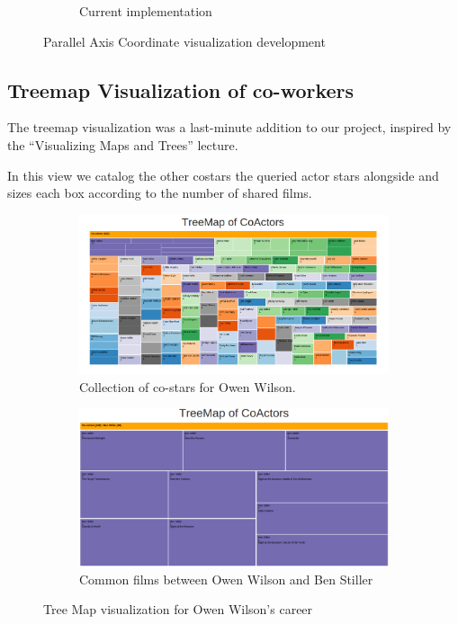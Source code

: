 \documentclass[12pt]{article}
\begin{document}
\begin{figure}[h!]
\begin{subfigure}[t]{.8\textwidth}
			  \caption{Current implementation}
			  \label{fig:sub2}
		\end{subfigure}%
		\caption{Parallel Axis Coordinate visualization development}
		\label{fig:parallelAxisCoordVis}
	\end{figure}


\newpage 

\subsection{Treemap Visualization of co-workers}

The treemap visualization was a last-minute addition to our project, inspired by the ``Visualizing Maps and Trees'' lecture.

In this view we catalog the other costars the queried actor stars alongside and sizes each box according to the number of shared films.
	\begin{figure}[h!]
		\centering
		\begin{subfigure}[t]{.5\textwidth}
		  \centering
		  \includegraphics[width=\linewidth]{images/treemapOwenWilson.png}
		  \caption{Collection of co-stars for Owen Wilson.}
		  \label{fig:treemapA}
		\end{subfigure}%
		\begin{subfigure}[t]{.8\textwidth}
		  \centering
		  \includegraphics[width=.7\linewidth]{images/treemapZoomWilson.png}
		  \caption{Common films between Owen Wilson and Ben Stiller}
		  \label{fig:treemapB}
		\end{subfigure}%
		\caption{Tree Map visualization for Owen Wilson's career}
		\label{fig:Treemap}
	\end{figure}
		
\end{document}
